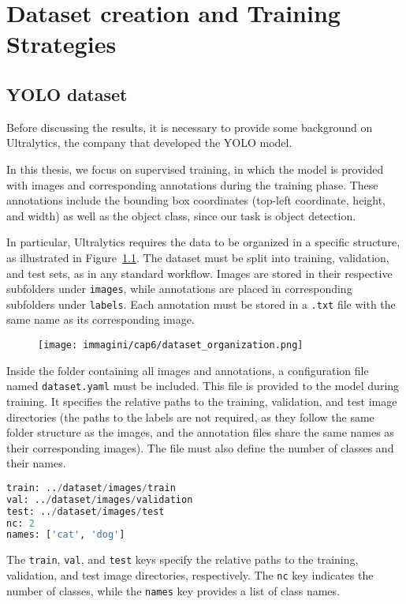 \chapter{Dataset creation and Training Strategies}

\section{YOLO dataset}
Before discussing the results, it is necessary to provide some background on Ultralytics, the company that developed the YOLO model.

In this thesis, we focus on supervised training, in which the model is provided with images and corresponding annotations during the training phase. These annotations include the bounding box coordinates (top-left coordinate, height, and width) as well as the object class, since our task is object detection.

In particular, Ultralytics requires the data to be organized in a specific structure, as illustrated in Figure~\ref{fig:yolo_organization}. The dataset must be split into training, validation, and test sets, as in any standard workflow. Images are stored in their respective subfolders under \texttt{images}, while annotations are placed in corresponding subfolders under \texttt{labels}. Each annotation must be stored in a \texttt{.txt} file with the same name as its corresponding image.

\begin{figure}[!ht]
    \centering 
    \texttt{[image: immagini/cap6/dataset\_organization.png]}
    \caption{}
    \label{fig:yolo_organization}
\end{figure}

Inside the folder containing all images and annotations, a configuration file named \texttt{dataset.yaml} must be included. This file is provided to the model during training.
It specifies the relative paths to the training, validation, and test image directories (the paths to the labels are not required, as they follow the same folder structure as the images, and the annotation files share the same names as their corresponding images).
The file must also define the number of classes and their names.

\begin{lstlisting}[language=Python]
train: ../dataset/images/train
val: ../dataset/images/validation
test: ../dataset/images/test
nc: 2
names: ['cat', 'dog']
\end{lstlisting}
The \texttt{train}, \texttt{val}, and \texttt{test} keys specify the relative paths to the training, validation, and test image directories, respectively. The \texttt{nc} key indicates the number of classes, while the \texttt{names} key provides a list of class names.

